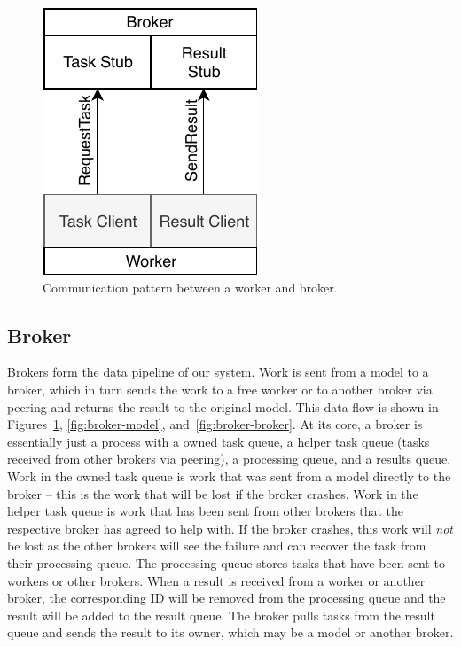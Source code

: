 \documentclass[conference]{IEEEtran}
\begin{document}

\begin{figure}
  \centering
  \includegraphics{img/broker_worker}
  \caption{Communication pattern between a worker and broker.}
  \label{fig:worker-broker}
\end{figure}

\subsection{Broker}
Brokers form the data pipeline of our system. Work is sent from a model to a
broker, which in turn sends the work to a free worker or to another broker via
peering and returns the result to
the original model. This data flow is shown in Figures~\ref{fig:worker-broker},
\ref{fig:broker-model}, and~\ref{fig:broker-broker}. At its core, a broker is essentially just a process with a
owned task queue, a helper task queue (tasks received from other brokers
via peering), a
processing queue, and a results queue. Work in the owned task queue is work that
was sent from a model directly to the broker -- this is the work that will be
lost if the broker crashes. Work in the helper task queue is work that has been
sent from other brokers that the respective broker has agreed to help with. If
the broker crashes, this work will \emph{not} be lost as the other brokers will
see the failure and can recover the task from their processing queue. The
processing queue stores tasks that have been sent to workers or other
brokers. When a result is received from a worker or another broker, the
corresponding ID will be removed from the processing queue and the result will
be added to the result queue. The broker pulls tasks from the result queue and
sends the result to its owner, which may be a model or another broker.
\end{document}
